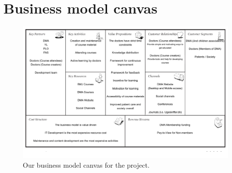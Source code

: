 \section{Business model canvas}
\begin{figure}[h!]
 \begin{center}
  \includegraphics[width=1\textwidth]{figures/business-model-canvas.pdf}
  \caption{Our business model canvas for the project.\label{dmaorganisation}}
 \end{center}
\end{figure}
